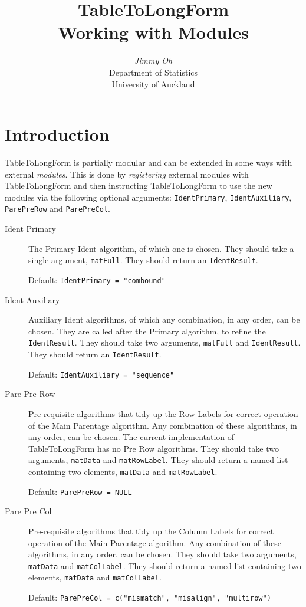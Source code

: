 \documentclass[a4paper]{article}
\begin{document}
\title{\textbf{TableToLongForm}\\
  Working with Modules}
\author{\textit{Jimmy Oh}\\
  [12pt] Department of Statistics\\
  University of Auckland}
\date{}
\maketitle

\section{Introduction}
TableToLongForm is partially modular and can be extended in some ways
with external \emph{modules}. This is done by \emph{registering}
external modules with TableToLongForm and then instructing
TableToLongForm to use the new modules via the following optional
arguments: \verb|IdentPrimary|, \verb|IdentAuxiliary|,
\verb|ParePreRow| and \verb|ParePreCol|.

\begin{description}
\item[Ident Primary] The Primary Ident algorithm, of which one is
  chosen. They should take a single argument, \verb|matFull|. They
  should return an \verb|IdentResult|.

  Default: \verb|IdentPrimary = "combound"|
\item[Ident Auxiliary] Auxiliary Ident algorithms, of which any
  combination, in any order, can be chosen. They are called after the
  Primary algorithm, to refine the \verb|IdentResult|. They should
  take two arguments, \verb|matFull| and \verb|IdentResult|. They
  should return an \verb|IdentResult|.

  Default: \verb|IdentAuxiliary = "sequence"|
\item[Pare Pre Row] Pre-requisite algorithms that tidy up the Row
  Labels for correct operation of the Main Parentage algorithm. Any
  combination of these algorithms, in any order, can be chosen. The
  current implementation of TableToLongForm has no Pre Row
  algorithms. They should take two arguments, \verb|matData| and
  \verb|matRowLabel|. They should return a named list containing two
  elements, \verb|matData| and \verb|matRowLabel|.

  Default: \verb|ParePreRow = NULL|
\item[Pare Pre Col] Pre-requisite algorithms that tidy up the Column
  Labels for correct operation of the Main Parentage algorithm. Any
  combination of these algorithms, in any order, can be chosen. They
  should take two arguments, \verb|matData| and
  \verb|matColLabel|. They should return a named list containing two
  elements, \verb|matData| and \verb|matColLabel|.

  Default: \verb|ParePreCol = c("mismatch", "misalign", "multirow")|
\end{description}
\end{document}
